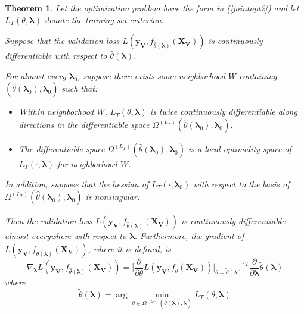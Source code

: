 \documentclass[10pt,letterpaper]{article}
\newtheorem{theorem}{Theorem}
\begin{document}
\begin{theorem}
Let the optimization problem have the form in (\ref{jointopt2}) and let $L_T(\theta, \boldsymbol{\lambda})$ denote the training set criterion.

Suppose that the validation loss $L(\boldsymbol{y_V}, f_{\hat \theta(\boldsymbol{\lambda})}(\boldsymbol{X_V}))$ is continuously differentiable with respect to $\hat \theta(\boldsymbol{\lambda})$.

For almost every $\boldsymbol{\lambda}_0$, suppose there exists some neighborhood $W$ containing $(\hat \theta(\boldsymbol{\lambda}_0), \boldsymbol{\lambda}_0)$ such that:
\begin{itemize}
\item Within neighborhood $W$, $L_T(\theta, \boldsymbol{\lambda})$ is twice continuously differentiable along directions in the differentiable space $\Omega^{(L_T)}(\hat \theta(\boldsymbol{\lambda}_0), \boldsymbol{\lambda}_0)$.
\item The differentiable space $\Omega^{(L_T)}(\hat \theta(\boldsymbol{\lambda}_0), \boldsymbol{\lambda}_0)$ is a local optimality space of $L_T(\cdot, \boldsymbol{\lambda})$ for neighborhood $W$.
\end{itemize}

In addition, suppose that the hessian of $L_T(\cdot , \boldsymbol{\lambda}_0)$ with respect to the basis of $\Omega^{(L_T)}(\hat \theta(\boldsymbol{\lambda}_0), \boldsymbol{\lambda}_0)$ is nonsingular.

Then the validation loss $L(\boldsymbol{y_V}, f_{\hat \theta(\boldsymbol{\lambda})}(\boldsymbol{X_V}))$ is continuously differentiable almost everywhere with respect to $\boldsymbol{\lambda}$. Furthermore, the gradient of $L(\boldsymbol{y_V}, f_{\hat \theta(\boldsymbol{\lambda})}(\boldsymbol{X_V}))$, where it is defined, is
\begin{equation}
\nabla_{\boldsymbol{\lambda}} L(\boldsymbol{y_V}, f_{\hat \theta(\boldsymbol{\lambda})}(\boldsymbol{X_V})) = \Big [ \frac{\partial}{\partial \theta} L(\boldsymbol{y_V}, f_{\dot \theta}(\boldsymbol{X_V})) |_{\theta=\tilde\theta(\lambda)} \Big ]^T \frac{\partial}{\partial \boldsymbol{\lambda}} \tilde{\theta}(\boldsymbol{\lambda})
\end{equation}
where
\begin{equation}
\tilde{\theta}(\boldsymbol{\lambda}) = \arg \min_{\theta \in \Omega^{(L_T)}(\hat \theta(\boldsymbol{\lambda}), \boldsymbol{\lambda})} L_T(\theta , \boldsymbol{\lambda})
\label{restrictedmodelparams}
\end{equation}

\label{thethrm}
\end{theorem}
\end{document}
